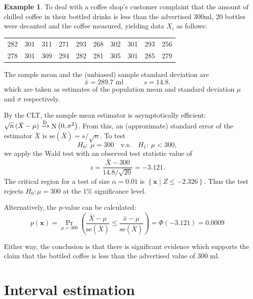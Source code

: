 \documentclass[
]{book}
\newcommand{\bx}{{\boldsymbol x}}
\DeclareMathOperator{\N}{N}
\theoremstyle{definition}
\theoremstyle{definition}
\newtheorem{example}{Example}[chapter]
\theoremstyle{definition}
\theoremstyle{definition}
\theoremstyle{remark}
\begin{document}
\begin{example}
\protect\hypertarget{exm:coffee}{}\label{exm:coffee}To deal with a coffee shop's customer complaint that the amount of chilled coffee in their bottled drinks is less than the advertised 300ml, 20 bottles were decanted and the coffee measured, yielding data \(X_i\) as follows:

\begin{longtable}[]{@{}cccccccccc@{}}
\toprule
\endhead
282 & 301 & 311 & 271 & 293 & 268 & 302 & 301 & 293 & 256 \\
278 & 301 & 309 & 294 & 282 & 281 & 305 & 301 & 285 & 279 \\
\bottomrule
\end{longtable}

The sample mean and the (unbiased) sample standard deviation are
\[
\bar x = 289.7 \text{ ml} \hspace{3em} s = 14.8. 
\]
which are taken as estimates of the population mean and standard deviation \(\mu\) and \(\sigma\) respectively.

By the CLT, the sample mean estimator is asymptotically efficient: \(\sqrt{n} \, (\bar X-\mu) \xrightarrow{\text D}\N\left(0, \sigma^2\right)\).
From this, an (approximate) standard error of the estimator \(\bar X\) is \(\text{se}(\bar X)=s/\sqrt n\).
To test
\[
H_0: \ \mu = 300 \hspace{1em}\text{v.s.}\hspace{1em} H_1: \ \mu < 300,
\]
we apply the Wald test with an observed test statistic value of
\[
z = \frac{\bar X - 300}{14.8/\sqrt{20}} = -3.121.
\]
The critical region for a test of size \(\alpha=0.01\) is \(\left\{\bx \mid Z \leq -2.326 \right\}\). Thus the test rejects \(H_0:\mu=300\) at the 1\% significance level.

Alternatively, the \(p\)-value can be calculated:
\[
p(\bx) = \Pr_{\mu=300}\left(\frac{\bar X - \mu}{\text{se}(\bar X)} \leq \frac{\bar x - \mu}{\text{se}(\bar X)}\right) = \Phi\left(-3.121 \right) = 0.0009
\]

Either way, the conclusion is that there is significant evidence which supports the claim that the bottled coffee is less than the advertised value of 300 ml.
\end{example}

\hypertarget{interval-estimation}{%
\chapter{Interval estimation}\label{interval-estimation}}
\end{document}
